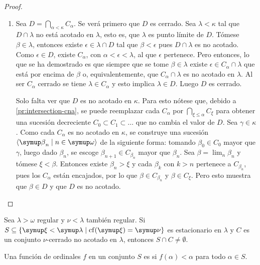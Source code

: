 \begin{proof}
\begin{enumerate}[label=(\roman*)]
        \item Sea $D = \dint_{\alpha<\kappa}C_\alpha$. Se verá primero que $D$ es cerrado.
            Sea $\lambda<\kappa$ tal que $D\cap\lambda$
            no está acotado en $\lambda$, esto es, que $\lambda$ es punto límite de $D$.
            Tómese $\beta\in\lambda$,
            entonces existe $\epsilon\in\lambda\cap D$ tal que $\beta<\epsilon$ pues
            $D\cap\lambda$ es no acotado.
            Como $\epsilon\in D$, existe $C_\alpha$, con $\alpha<\epsilon<\lambda$,
            al que $\epsilon$ pertenece.
            Pero entonces, lo que se ha demostrado es que siempre que se tome $\beta\in\lambda$
            existe $\epsilon\in C_\alpha\cap\lambda$ que está por encima de $\beta$ o, equivalentemente,
            que $C_\alpha\cap\lambda$ es no acotado en $\lambda$.
            Al ser $C_\alpha$ cerrado se tiene $\lambda\in C_\alpha$ y esto implica
            $\lambda\in D$. Luego $D$ es cerrado.

            Solo falta ver que $D$ es no acotado en $\kappa$.
            Para esto nótese que, debido a \ref{pr:intersection-cna},
            se puede reemplazar cada $C_\alpha$ por $\bigcap_{\xi\leq\alpha} C_\xi$
            para obtener una sucesión decreciente $C_0\subset C_1\subset\dots$
            que no cambia el valor de $D$.
            Sea $\gamma\in\kappa$. Como cada $C_\alpha$ es no acotado en $\kappa$,
            se construye una sucesión $\seq{\beta_n\mid n\in\omega}$ de la siguiente forma:
            tomando $\beta_0\in C_0$ mayor que $\gamma$, luego dado $\beta_n$, se escoge
            $\beta_{n+1} \in C_{\beta_n}$ mayor que $\beta_n$. Sea $\beta = \lim_n\beta_n$
            y tómese $\xi<\beta$. Entonces existe $\beta_n>\xi$ y cada $\beta_k$ con $k>n$
            pertenece a $C_{\beta_n}$, pues los $C_\alpha$ están encajados,
            por lo que $\beta\in C_{\beta_n}$ y $\beta\in C_\xi$.
            Pero esto muestra que $\beta\in D$ y que $D$ es no acotado.
    \end{enumerate}
\end{proof}

\begin{teo}\label{teo:stationary-intersect}
    Sea $\lambda>\omega$ regular y $\nu<\lambda$ también regular.
    Si $S\subseteq\set{\xi<\lambda\mid \cf(\xi)=\nu}$ es estacionario en $\lambda$
    y $C$ es un conjunto $\nu$-cerrado no acotado en $\lambda$, entonces $S\cap C\neq\emptyset$.
\end{teo}

\begin{defi}
    Una función de ordinales $f$ en un conjunto $S$ es  si
    $f(\alpha)<\alpha$ para todo $\alpha\in S$.
\end{defi}

